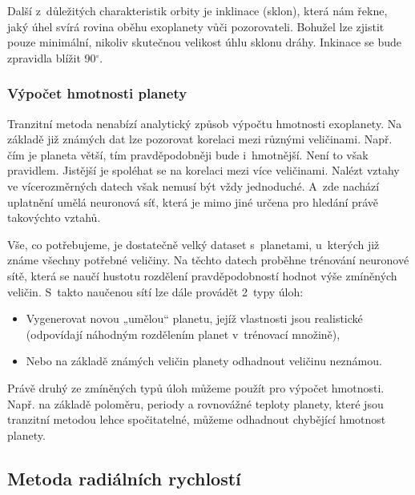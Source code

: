 \documentclass[a4paper,12pt]{article}
\begin{document}
{{Další z~důležitých charakteristik orbity je inklinace (sklon), která nám řekne, jaký úhel svírá rovina oběhu exoplanety vůči pozorovateli. Bohužel lze zjistit pouze minimální, nikoliv skutečnou velikost úhlu sklonu dráhy. Inkinace se bude zpravidla blížit 90$^{\circ}$.~\cite{transitprops}


\subsubsection{Výpočet hmotnosti planety}

Tranzitní metoda nenabízí analytický způsob výpočtu hmotnosti exoplanety. Na základě již známých dat lze pozorovat korelaci mezi různými veličinami. Např. čím je planeta větší, tím pravděpodobněji bude i~hmotnější. Není to však pravidlem. Jistější je spoléhat se na korelaci mezi více veličinami. Nalézt vztahy ve vícerozměrných datech však nemusí být vždy jednoduché. A~zde nachází uplatnění umělá neuronová síť, která je mimo jiné určena pro hledání právě takovýchto vztahů.~\cite{nnmass}

Vše, co potřebujeme, je dostatečně velký dataset s~planetami, u~kterých již známe všechny potřebné veličiny. Na těchto datech proběhne trénování neuronové sítě, která se naučí hustotu rozdělení pravděpodobností hodnot výše zmíněných veličin. S~takto naučenou sítí lze dále provádět 2~typy úloh:

\begin{itemize}
\item Vygenerovat novou „umělou“ planetu, jejíž vlastnosti jsou realistické (odpovídají náhodným rozdělením planet v~trénovací množině),

\item Nebo na základě známých veličin planety odhadnout veličinu neznámou.
\end{itemize}

Právě druhý ze zmíněných typů úloh můžeme použít pro výpočet hmotnosti. Např. na základě poloměru, periody a rovnovážné teploty planety, které jsou tranzitní metodou lehce spočitatelné, můžeme odhadnout chybějící hmotnost planety.~\cite{nnmass}

\clearpage
\subsection{Metoda radiálních rychlostí}

}}
\end{document}
